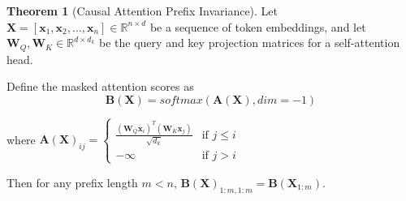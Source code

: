 \documentclass{article} %
\theoremstyle{definition}
\newtheorem{theorem}{Theorem}[section]
\begin{document}





\begin{theorem}[Causal Attention Prefix Invariance]
Let $\mathbf{X} = [\mathbf{x}_1, \mathbf{x}_2, \ldots, \mathbf{x}_n] \in \mathbb{R}^{n \times d}$ be a sequence of token embeddings, and let $\mathbf{W}_Q, \mathbf{W}_K \in \mathbb{R}^{d \times d_k}$ be the query and key projection matrices for a self-attention head.

Define the masked attention scores as 
\begin{equation}
    \mathbf{B}(\mathbf{X}) = softmax(\mathbf{A}(\mathbf{X}), dim = -1)
\end{equation}

where $\mathbf{A}(\mathbf{X})_{ij} = 
\begin{cases}
    \frac{(\mathbf{W}_Q \mathbf{x}_i)^T (\mathbf{W}_K \mathbf{x}_j)}{\sqrt{d_k}} & \text{if } j \leq i \\
    -\infty & \text{if } j > i
\end{cases}$

Then for any prefix length $m < n$, $\mathbf{B}(\mathbf{X})_{1:m,1:m} = \mathbf{B}(\mathbf{X}_{1:m})$.
\end{theorem}
\end{document}
